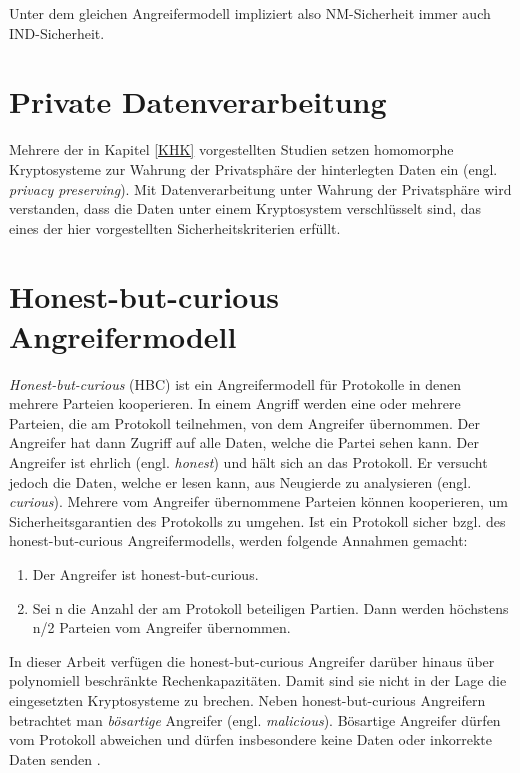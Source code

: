 Unter dem gleichen Angreifermodell impliziert also NM-Sicherheit immer auch IND-Sicherheit. 

\section{Private Datenverarbeitung}
\label{privacypreserving}
Mehrere der in Kapitel \ref{KHK} vorgestellten Studien setzen homomorphe Kryptosysteme zur Wahrung der Privatsphäre der hinterlegten Daten ein (engl. \textit{privacy preserving}). Mit Datenverarbeitung unter Wahrung der Privatsphäre wird verstanden, dass die Daten unter einem Kryptosystem verschlüsselt sind, das eines der hier vorgestellten Sicherheitskriterien erfüllt.

\section{Honest-but-curious Angreifermodell}
\label{hbc}

\textit{Honest-but-curious} (HBC) ist ein Angreifermodell für Protokolle in denen mehrere Parteien kooperieren. In einem Angriff werden eine oder mehrere Parteien, die am Protokoll teilnehmen, von dem Angreifer übernommen. Der Angreifer hat dann Zugriff auf alle Daten, welche die Partei sehen kann. Der Angreifer ist ehrlich (engl. \textit{honest}) und hält sich an das Protokoll. Er versucht jedoch die Daten, welche er lesen kann, aus Neugierde zu analysieren (engl. \textit{curious}). Mehrere vom Angreifer übernommene Parteien können kooperieren, um Sicherheitsgarantien des Protokolls zu umgehen. Ist ein Protokoll sicher bzgl. des honest-but-curious Angreifermodells, werden folgende Annahmen gemacht:
\begin{enumerate}
	\item Der Angreifer ist honest-but-curious.
	\item Sei n die Anzahl der am Protokoll beteiligen Partien. Dann werden höchstens n/2 Parteien vom Angreifer übernommen.
\end{enumerate}
In dieser Arbeit verfügen die honest-but-curious Angreifer darüber hinaus über polynomiell beschränkte Rechenkapazitäten. Damit sind sie nicht in der Lage die eingesetzten Kryptosysteme zu brechen.
Neben honest-but-curious Angreifern betrachtet man \textit{bösartige} Angreifer (engl. \textit{malicious}). Bösartige Angreifer dürfen vom Protokoll abweichen und dürfen insbesondere keine Daten oder inkorrekte Daten senden  \cite[p.385]{smart2003}.